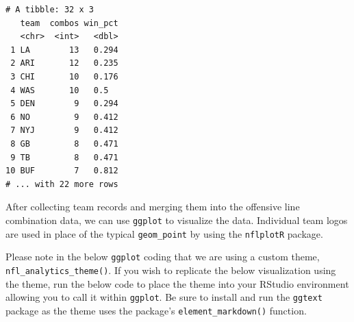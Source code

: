 \documentclass[
  letterpaper,
]{krantz}
\begin{document}
\begin{verbatim}
# A tibble: 32 x 3
   team  combos win_pct
   <chr>  <int>   <dbl>
 1 LA        13   0.294
 2 ARI       12   0.235
 3 CHI       10   0.176
 4 WAS       10   0.5  
 5 DEN        9   0.294
 6 NO         9   0.412
 7 NYJ        9   0.412
 8 GB         8   0.471
 9 TB         8   0.471
10 BUF        7   0.812
# ... with 22 more rows
\end{verbatim}

After collecting team records and merging them into the offensive line
combination data, we can use \texttt{ggplot} to visualize the data.
Individual team logos are used in place of the typical
\texttt{geom\_point} by using the \texttt{nflplotR} package.

\begin{tcolorbox}[enhanced jigsaw, left=2mm, toprule=.15mm, opacitybacktitle=0.6, leftrule=.75mm, bottomrule=.15mm, colbacktitle=quarto-callout-important-color!10!white, breakable, colback=white, bottomtitle=1mm, toptitle=1mm, title=\textcolor{quarto-callout-important-color}{\faExclamation}\hspace{0.5em}{Important}, coltitle=black, titlerule=0mm, arc=.35mm, opacityback=0, colframe=quarto-callout-important-color-frame, rightrule=.15mm]

Please note in the below \texttt{ggplot} coding that we are using a
custom theme, \texttt{nfl\_analytics\_theme()}. If you wish to replicate
the below visualization using the theme, run the below code to place the
theme into your RStudio environment allowing you to call it within
\texttt{ggplot}. Be sure to install and run the \texttt{ggtext} package
as the theme uses the package's \texttt{element\_markdown()} function.

\end{tcolorbox}
\end{document}
